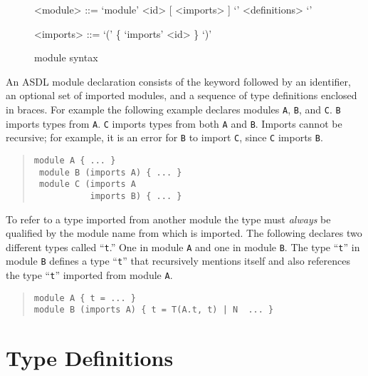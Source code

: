\begin{figure}[ht]
  \begin{center}
    \begin{grammar}
      <module>  ::=  `module' <id> [ <imports> ] `{' <definitions> `}'

      <imports> ::=  `(' \{ `imports' <id> \} `)'
    \end{grammar}
  \end{center}
  \caption{\asdl{} module syntax}
\end{figure}%

An ASDL module declaration consists of the keyword 
followed by an identifier, an optional set of imported modules, and a
sequence of type definitions enclosed in braces. For example the
following example declares modules \lstinline[language=ASDL]!A!,
\lstinline[language=ASDL]!B!, and \lstinline[language=ASDL]!C!.
\lstinline[language=ASDL]!B! imports types from \lstinline[language=ASDL]!A!.
\lstinline[language=ASDL]!C! imports types from both \lstinline[language=ASDL]!A! and
\lstinline[language=ASDL]!B!.
Imports cannot be recursive; for example, it is an error for \lstinline[language=ASDL]!B! to
import \lstinline[language=ASDL]!C!, since \lstinline[language=ASDL]!C!
imports \lstinline[language=ASDL]!B!.
\begin{quote}\begin{lstlisting}[language=ASDL]
 module A { ... } 
 module B (imports A) { ... }
 module C (imports A 
           imports B) { ... }
\end{lstlisting}\end{quote}%

To refer to a type imported from another module the type must
\emph{always} be qualified by the module name from which is
imported.
The following declares two different types called ``\texttt{t}.''
One in module \texttt{A} and one in module \texttt{B}.
The type ``\texttt{t}'' in module \texttt{B} defines a type ``\texttt{t}'' that
recursively mentions itself and also references the type ``\texttt{t}'' imported
from module \texttt{A}.
\begin{quote}\begin{lstlisting}[language=ASDL]
module A { t = ... } 
module B (imports A) { t = T(A.t, t) | N  ... }
\end{lstlisting}\end{quote}%

\section{Type Definitions}


